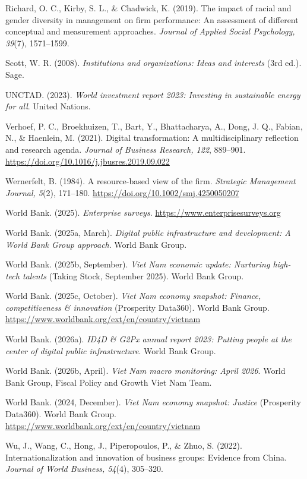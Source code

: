 \documentclass[
  12pt,a4paper]{article}
\begin{document}
Richard, O. C., Kirby, S. L., \& Chadwick, K. (2019). The impact of
racial and gender diversity in management on firm performance: An
assessment of different conceptual and measurement approaches.
\emph{Journal of Applied Social Psychology, 39}(7), 1571--1599.

Scott, W. R. (2008). \emph{Institutions and organizations: Ideas and
interests} (3rd ed.). Sage.

UNCTAD. (2023). \emph{World investment report 2023: Investing in
sustainable energy for all}. United Nations.

Verhoef, P. C., Broekhuizen, T., Bart, Y., Bhattacharya, A., Dong, J.
Q., Fabian, N., \& Haenlein, M. (2021). Digital transformation: A
multidisciplinary reflection and research agenda. \emph{Journal of
Business Research, 122}, 889--901.
\url{https://doi.org/10.1016/j.jbusres.2019.09.022}

Wernerfelt, B. (1984). A resource-based view of the firm.
\emph{Strategic Management Journal, 5}(2), 171--180.
\url{https://doi.org/10.1002/smj.4250050207}

World Bank. (2025). \emph{Enterprise surveys}.
\url{https://www.enterprisesurveys.org}

World Bank. (2025a, March). \emph{Digital public infrastructure and
development: A World Bank Group approach}. World Bank Group.

World Bank. (2025b, September). \emph{Viet Nam economic update:
Nurturing high-tech talents} (Taking Stock, September 2025). World Bank
Group.

World Bank. (2025c, October). \emph{Viet Nam economy snapshot: Finance,
competitiveness \& innovation} (Prosperity Data360). World Bank Group.
\url{https://www.worldbank.org/ext/en/country/vietnam}

World Bank. (2026a). \emph{ID4D \& G2Px annual report 2023: Putting
people at the center of digital public infrastructure}. World Bank
Group.

World Bank. (2026b, April). \emph{Viet Nam macro monitoring: April
2026}. World Bank Group, Fiscal Policy and Growth Viet Nam Team.

World Bank. (2024, December). \emph{Viet Nam economy snapshot: Justice}
(Prosperity Data360). World Bank Group.
\url{https://www.worldbank.org/ext/en/country/vietnam}

Wu, J., Wang, C., Hong, J., Piperopoulos, P., \& Zhuo, S. (2022).
Internationalization and innovation of business groups: Evidence from
China. \emph{Journal of World Business, 54}(4), 305--320.
\end{document}
